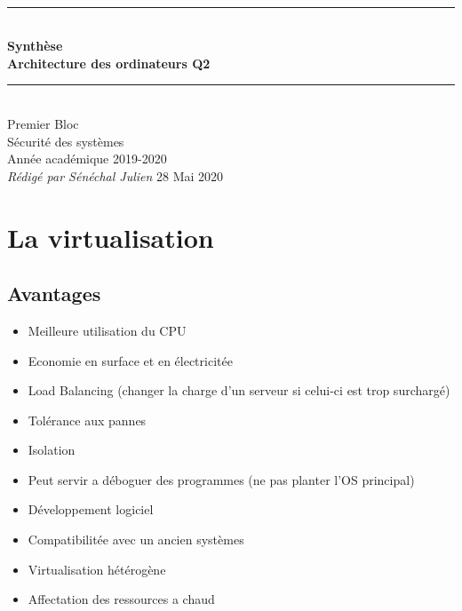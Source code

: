 \documentclass[a4paper]{article}
\newcommand{\HRule}{\rule{\linewidth}{0.5mm}}
\newcommand{\bgimg}[1]{
\AddToShipoutPicture
   {
      \put(\LenToUnit{0 cm},\LenToUnit{0 cm})
      {
            \texttt{[image: \#1]} 
      }
   }
}
\begin{document}





  \begin{titlepage}
    \begin{sffamily}
    \begin{center}
      \textnormal{}\\[6.5cm]
      \HRule \\[0.4cm]
      { \Huge \bfseries Synthèse\\ Architecture des ordinateurs Q2\\ [0.4cm] }
      \HRule \\[3cm]
      \Large
      Premier Bloc\\
      Sécurité des systèmes\\
      Année académique 2019-2020\\[0.2cm]
      \emph{Rédigé par Sénéchal Julien}
      \vfill
      {\large 28 Mai 2020}
    \end{center}
    \end{sffamily}
  \end{titlepage}

  \section{La virtualisation}
    \subsection{Avantages}

      \begin{itemize}
      \item Meilleure utilisation du CPU
      \item Economie en surface et en électricitée
      \item Load Balancing (changer la charge d'un serveur si celui-ci est trop surchargé)
      \item Tolérance aux pannes
      \item Isolation
      \item Peut servir a déboguer des programmes (ne pas planter l'OS principal)
      \item Développement logiciel
      \item Compatibilitée avec un ancien systèmes
      \item Virtualisation hétérogène
      \item Affectation des ressources a chaud
      \end{itemize}
\end{document}
